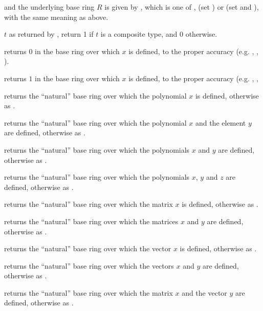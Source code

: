 and the underlying base ring $R$ is given by , which
is one of ,  (set ) or 
(set  and ), with the same meaning
as above.

 $t$ as returned by ,
return 1 if $t$ is a composite type, and 0 otherwise.

 returns $0$ in the base ring over which $x$
is defined, to the proper accuracy (e.g. , ,
).

 returns $1$ in the base ring over which $x$
is defined, to the proper accuracy (e.g. , ,

 returns
the ``natural'' base ring over which the polynomial $x$ is defined,
otherwise as .

returns the ``natural'' base ring over which the polynomial $x$ and the element
$y$ are defined, otherwise as .

 returns
the ``natural'' base ring over which the polynomials $x$ and $y$ are defined,
otherwise as .

returns the ``natural'' base ring over which the polynomials $x$, $y$ and $z$
are defined, otherwise as .

 returns
the ``natural'' base ring over which the matrix $x$ is defined,
otherwise as .

 returns
the ``natural'' base ring over which the matrices $x$ and $y$ are defined,
otherwise as .

 returns
the ``natural'' base ring over which the vector $x$ is defined,
otherwise as .

 returns
the ``natural'' base ring over which the vectors $x$ and $y$ are defined,
otherwise as .

returns the ``natural'' base ring over which the matrix $x$ and the vector
$y$ are defined, otherwise as .

